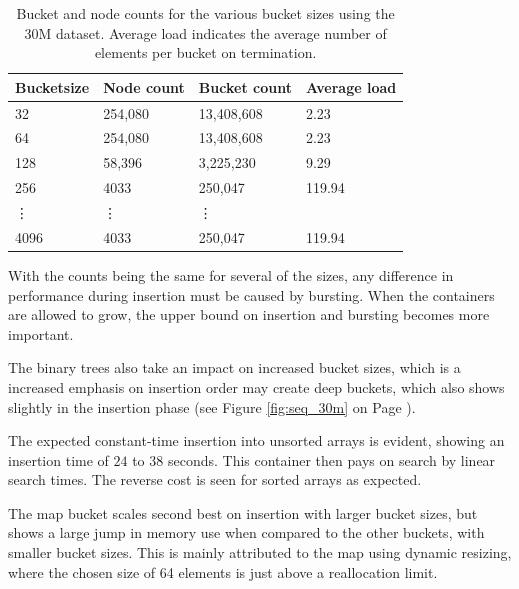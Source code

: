 \begin{table}[h]
    \centering
    \begin{tabular}[here]{ l l l l }
        \hline
        Bucketsize& Node count  & Bucket count & Average load  \\\hline
        32        &  254,080    & 13,408,608   & 2.23\\
        64        &  254,080    & 13,408,608   & 2.23\\
        128       &  58,396     & 3,225,230    & 9.29\\
        256       &  4033       & 250,047      & 119.94\\
        \vdots    &  \vdots     & \vdots       &\\
        4096      &  4033       & 250,047      & 119.94\\\hline 
    \end{tabular}
    \caption{Bucket and node counts for the various bucket sizes using the
        30M dataset. Average load indicates the average number of elements
        per bucket on termination.}
    \label{tab:bncounts_30M}
\end{table}

With the counts being the same for several of the sizes, any difference in performance
during insertion must be caused by bursting. When the containers are allowed to grow,
the upper bound on insertion and bursting becomes more important.

The binary trees also take an impact on increased bucket sizes, which
is a increased emphasis on insertion order may create deep buckets, which also
shows slightly in the insertion phase (see Figure \ref{fig:seq_30m} on
Page \pageref{fig:seq_30m}).

The expected constant-time insertion into unsorted arrays is evident, showing
an insertion time of $24$ to $38$ seconds. This container then pays on search
by linear search times. The reverse cost is seen for sorted arrays as expected.

The {\keyword map} bucket scales second best on insertion with larger bucket
sizes, but shows a large jump in memory use when compared to the other buckets,
with smaller bucket sizes. This is mainly attributed to the {\keyword map}
using dynamic resizing, where the chosen size of 64 elements is just above a
reallocation limit.

